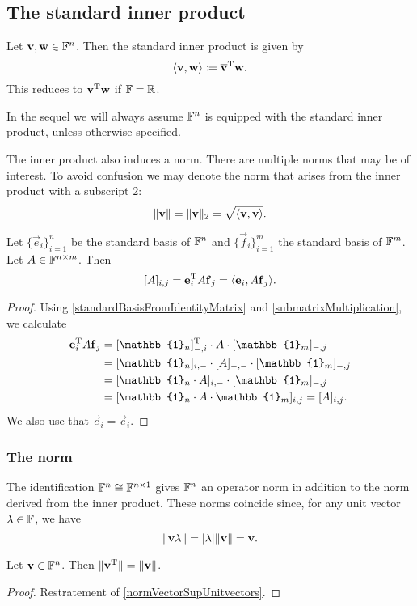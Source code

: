 \subsection{The standard inner product}
Let $\boldsymbol{\mathrm{v}},\boldsymbol{\mathrm{w}}\in\mathbb{F}^n$. Then the standard inner product is given by
\[ \inner{\vec{v},\vec{w}} \defeq \overline{\vec{v}}^\transp \vec{w}. \]
This reduces to $\boldsymbol{\mathrm{v}}^{\mathrm{T}}\boldsymbol{\mathrm{w}}$ if $\mathbb{F} = \mathbb{R}$.

In the sequel we will always assume $\mathbb{F}^n$ is equipped with the standard inner product, unless otherwise specified.

The inner product also induces a norm. There are multiple norms that may be of interest. To avoid confusion we may denote the norm that arises from the inner product with a subscript 2:
\[ \norm{\vec{v}} = \norm{\vec{v}}_2 = \sqrt{\inner{\vec{v},\vec{v}}}. \]

\begin{lemma} \label{componentsFromStandardInnerProduct}
Let $\{\vec{e}_i\}_{i=1}^n$ be the standard basis of $\mathbb{F}^n$ and $\{\vec{f}_i\}_{i=1}^m$ the standard basis of $\mathbb{F}^m$. Let $A\in\mathbb{F}^{n\times m}$. Then
\[ [A]_{i,j} = \vec{e}^\transp_i A \vec{f}_j = \inner{\vec{e}_i, A\vec{f}_j}. \]
\end{lemma}
\begin{proof}
Using \ref{standardBasisFromIdentityMatrix} and \ref{submatrixMultiplication}, we calculate
\begin{align*}
\vec{e}^\transp_i A \vec{f}_j &= [\mathbb{1}_n]_{-,i}^\transp \cdot A \cdot [\mathbb{1}_m]_{-,j} \\
&= [\mathbb{1}_n]_{i, -} \cdot [A]_{-,-} \cdot [\mathbb{1}_m]_{-,j} \\
&= [\mathbb{1}_n\cdot A]_{i,-}\cdot [\mathbb{1}_m]_{-,j} \\
&= [\mathbb{1}_n\cdot A\cdot\mathbb{1}_m]_{i,j} = [A]_{i,j}.
\end{align*}
We also use that $\overline{\vec{e}_i} = \vec{e}_i$.
\end{proof}

\subsubsection{The norm}
The identification $\mathbb{F}^n \cong \mathbb{F}^{n\times 1}$ gives $\mathbb{F}^n$ an operator norm in addition to the norm derived from the inner product. These norms coincide since, for any unit vector $\lambda\in \mathbb{F}$, we have
\[ \lVert\boldsymbol{\mathrm{v}}\lambda\rVert = |\lambda| \lVert\boldsymbol{\mathrm{v}}\rVert = \boldsymbol{\mathrm{v}}. \]

\begin{lemma}
Let $\boldsymbol{\mathrm{v}}\in\mathbb{F}^n$. Then $\lVert\boldsymbol{\mathrm{v}}^{\mathrm{T}}\rVert = \lVert\boldsymbol{\mathrm{v}}\rVert$.
\end{lemma}
\begin{proof}
Restratement of \ref{normVectorSupUnitvectors}.
\end{proof}

